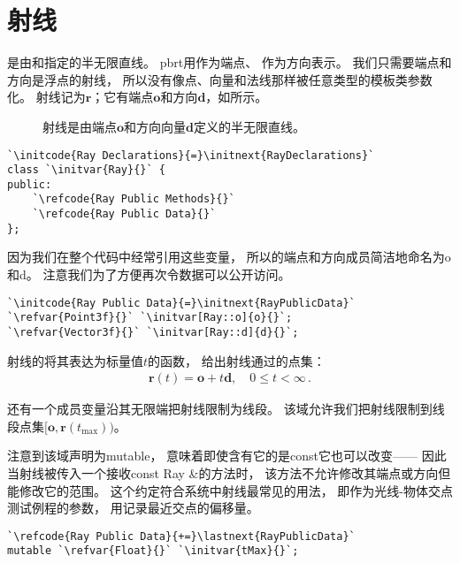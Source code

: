 \section{射线}\label{sec:射线}

是由和指定的半无限直线。
pbrt用作为端点、
作为方向表示。
我们只需要端点和方向是浮点的射线，
所以没有像点、向量和法线那样被任意类型的模板类参数化。
射线记为$\bm r$；它有端点$\bm o$和方向$\bm d$，如所示。
\begin{figure}[htbp]
    \centering
    \caption{射线是由端点$\bm o$和方向向量$\bm d$定义的半无限直线。}
    \label{fig:2.7}
\end{figure}

\begin{lstlisting}
`\initcode{Ray Declarations}{=}\initnext{RayDeclarations}`
class `\initvar{Ray}{}` {
public:
    `\refcode{Ray Public Methods}{}`
    `\refcode{Ray Public Data}{}`
};
\end{lstlisting}

因为我们在整个代码中经常引用这些变量，
所以的端点和方向成员简洁地命名为{\ttfamily o}和{\ttfamily d}。
注意我们为了方便再次令数据可以公开访问。
\begin{lstlisting}
`\initcode{Ray Public Data}{=}\initnext{RayPublicData}`
`\refvar{Point3f}{}` `\initvar[Ray::o]{o}{}`;
`\refvar{Vector3f}{}` `\initvar[Ray::d]{d}{}`;
\end{lstlisting}

射线的将其表达为标量值$t$的函数，
给出射线通过的点集：
\begin{align}\label{eq:2.3}
    \bm r(t)=\bm o+t\bm d,\quad 0\le t<\infty\, .
\end{align}

还有一个成员变量沿其无限端把射线限制为线段。
该域允许我们把射线限制到线段点集$[\bm o,\bm r(t_{\max}))$。

注意到该域声明为{\ttfamily mutable}，
意味着即使含有它的是{\ttfamily const}它也可以改变——
因此当射线被传入一个接收{\ttfamily const Ray \&}的方法时，
该方法不允许修改其端点或方向但能修改它的范围。
这个约定符合系统中射线最常见的用法，
即作为光线-物体交点测试例程的参数，
用记录最近交点的偏移量。
\begin{lstlisting}
`\refcode{Ray Public Data}{+=}\lastnext{RayPublicData}`
mutable `\refvar{Float}{}` `\initvar{tMax}{}`;
\end{lstlisting}


